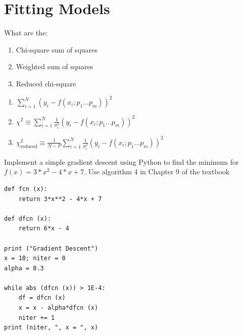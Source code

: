 \documentclass[12pt]{article}
\begin{document}


\section{Fitting Models}


\begin{question}
What are the:
\begin{enumerate}
  \item Chi-square sum of squares
  \item Weighted sum of squares
  \item Reduced chi-square
\end{enumerate}
\end{question}
\begin{solution}
\begin{enumerate}
\item $\sum_{i=1}^N (y_i - f (x_i; p_1\ldots p_m))^2$
\item $\chi^2 \equiv \sum_{i=1}^N \frac{1}{{\sigma_i^2}} \left(y_i - f (x_i; p_1\ldots p_m )\right)^2$
\item $\chi^2_{\text{reduced}} \equiv \frac{1}{N- P}\sum_{i=1}^N \frac{1}{{\sigma_i^2}} \left(y_i - f (x_i; p_1\ldots p_m )\right)^2$
\end{enumerate}
\end{solution}


\begin{question}
Implement a simple gradient descent using Python to find the minimum for $f(x) = 3*x^2 - 4*x + 7$. Use algorithm 4 in Chapter 9 of the textbook
\end{question}
\cprotEnv\begin{solution}
\begin{verbatim}
def fcn (x):
    return 3*x**2 - 4*x + 7

def dfcn (x):
    return 6*x - 4

print ("Gradient Descent")
x = 10; niter = 0
alpha = 0.3

while abs (dfcn (x)) > 1E-4:
    df = dfcn (x)
    x = x - alpha*dfcn (x)
    niter += 1
print (niter, ", x = ", x)
\end{verbatim}
\end{solution}
\end{document}
